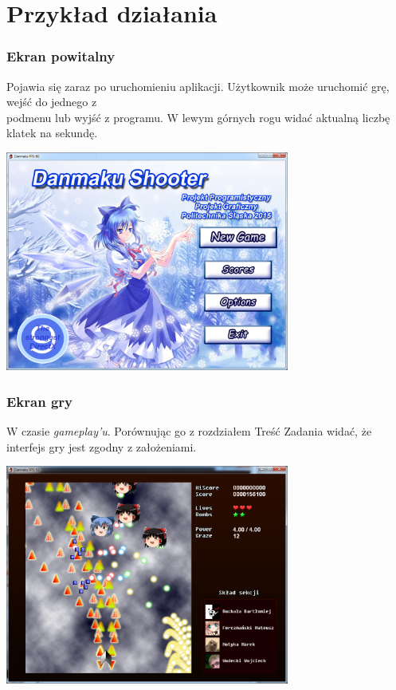 \newpage
\part{\huge \textbf{Przykład działania}}
	\section*{Ekran powitalny}
		Pojawia się zaraz po uruchomieniu aplikacji. Użytkownik może uruchomić grę, wejść do jednego z\\podmenu lub wyjść z programu. W lewym górnych rogu widać aktualną liczbę klatek na sekundę.
		\begin{center}
			\includegraphics[width=0.7\textwidth]{./images/titlescreen}
		\end{center}
	\section*{Ekran gry}
		W czasie \textit{gameplay'u}. Porównując go z rozdziałem Treść Zadania widać, że interfejs gry jest zgodny z założeniami.
		\begin{center}
			\includegraphics[width=0.7\textwidth]{./images/gameplay}
		\end{center}
		
